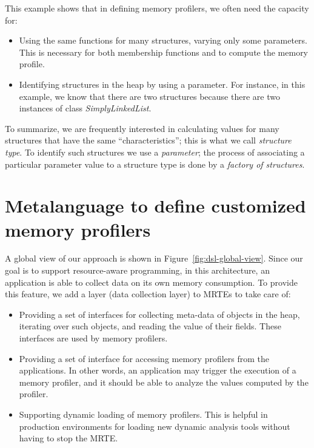This example shows that in defining memory profilers, we often need the capacity for:

\begin{itemize}
\item Using the same functions for many structures, varying only some parameters. This is necessary for both membership functions and to compute the memory profile.

\item Identifying structures in the heap by using a parameter. For instance, in this example, we know that there are two structures because there are two instances of class \textit{SimplyLinkedList}.
\end{itemize}

To summarize, we are frequently interested in calculating values for many structures that have the same ``characteristics''; this is what we call \textit{structure type}.
To identify such structures we use a \textit{parameter}; the process of associating a particular parameter value to a structure type is done by a \textit{factory of structures}. 

\section{Metalanguage to define customized memory profilers}\label{sec:approach}

A global view of our approach is shown in Figure~\ref{fig:dsl-global-view}.
Since our goal is to support resource-aware programming, in this architecture, an application is able to collect data on its own memory consumption.
To provide this feature, we add a layer (data collection layer) to MRTEs to take care of: 

\begin{itemize}
\item Providing a set of interfaces for collecting meta-data of objects in the heap, iterating over such objects, and reading the value of their fields.
These interfaces are used by memory profilers.

\item Providing a set of interface for accessing memory profilers from the applications.
In other words, an application may trigger the execution of a memory profiler, and it should be able to analyze the values computed by the profiler.

\item Supporting dynamic loading of memory profilers.
This is helpful in production environments for loading new dynamic analysis tools without having to stop the MRTE.
\end{itemize}


